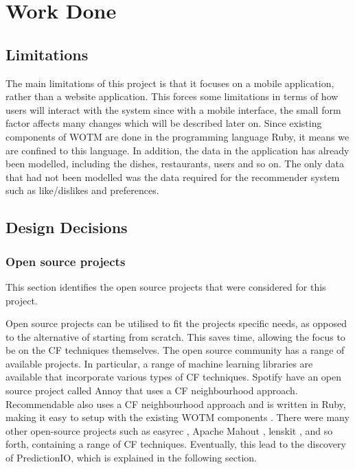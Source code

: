 \chapter{Work Done}\label{C:work_done}

\section{Limitations}

The main limitations of this project is that it focuses on a mobile application, rather than a website application. This forces some limitations in terms of how users will interact with the system since with a mobile interface, the small form factor affects many changes which will be described later on. Since existing components of WOTM are done in the programming language Ruby, it means we are confined to this language. In addition, the data in the application has already been modelled, including the dishes, restaurants, users and so on. The only data that had not been modelled was the data required for the recommender system such as like/dislikes and preferences.   

\section{Design Decisions}

\subsection{Open source projects}
This section identifies the open source projects that were considered for this project.

Open source projects can be utilised to fit the projects specific needs, as opposed to the alternative of starting from scratch. This saves time, allowing the focus to be on the CF techniques themselves. The open source community has a range of available projects. In particular, a range of machine learning libraries are available that incorporate various types of CF techniques. Spotify have an open source project called Annoy \cite{annoy} that uses a CF neighbourhood approach. Recommendable \cite{recommendable} also uses a CF neighbourhood approach and is written in Ruby, making it easy to setup with the existing WOTM components \cite{recommendable}. There were many other open-source projects such as easyrec \cite{easyrec}, Apache Mahout \cite{mahoutaction}, lenskit \cite{lenskit}, and so forth, containing a range of CF techniques. 
Eventually, this lead to the discovery of PredictionIO, which is explained in the following section.

